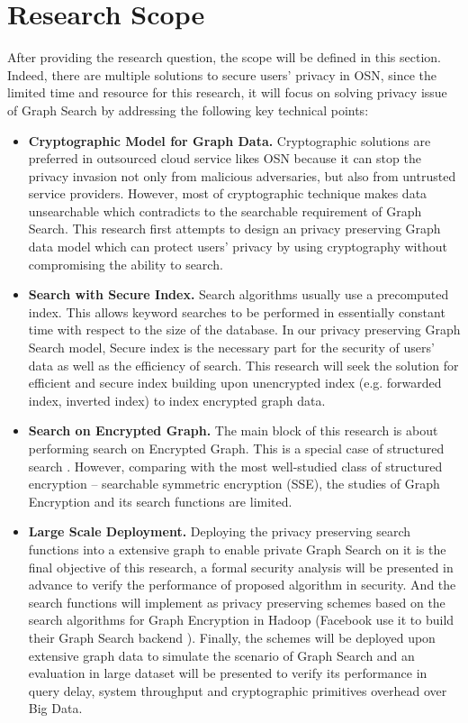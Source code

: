 \section{Research Scope}
After providing the research question, the scope will be defined in this section. Indeed, there are multiple solutions to secure users' privacy in OSN, since the limited time and resource for this research, it will focus on solving privacy issue of Graph Search by addressing the following key technical points:
\begin{itemize}
\setlength{\itemsep}{0pt}
\item{\bf Cryptographic Model for Graph Data.} Cryptographic solutions are preferred in outsourced cloud service likes OSN because it can stop the privacy invasion not only from malicious adversaries, but also from untrusted service providers. However, most of cryptographic technique makes data unsearchable which contradicts to the searchable requirement of Graph Search. This research first attempts to design an privacy preserving Graph data model which can protect users' privacy by using cryptography without compromising the ability to search.
\item{\bf Search with Secure Index.} Search algorithms usually use a precomputed index. This allows keyword searches to be performed in essentially constant time with respect to the size of the database. In our privacy preserving Graph Search model, Secure index is the necessary part for the security of users' data as well as the efficiency of search. This research will seek the solution for efficient and secure index building upon unencrypted index (e.g. forwarded index, inverted index) to index encrypted graph data.
\item{\bf Search on Encrypted Graph.} The main block of this research is about performing search on Encrypted Graph. This is a special case of structured search \cite{chase2010structured}. However, comparing with the most well-studied class of structured encryption -- searchable symmetric encryption (SSE), the studies of Graph Encryption and its search functions are limited.
\item {\bf Large Scale Deployment.} Deploying the privacy preserving search functions into a extensive graph to enable private Graph Search on it is the final objective of this research, a formal security analysis will be presented in advance to verify the performance of proposed algorithm in security. And the search functions will implement as privacy preserving schemes based on the search algorithms for Graph Encryption in Hadoop (Facebook use it to build their Graph Search backend \cite{curtiss2013unicorn}). Finally, the schemes will be deployed upon extensive graph data to simulate the scenario of Graph Search and an evaluation in large dataset will be presented to verify its performance in query delay, system throughput and cryptographic primitives overhead over Big Data. 

\end{itemize}

